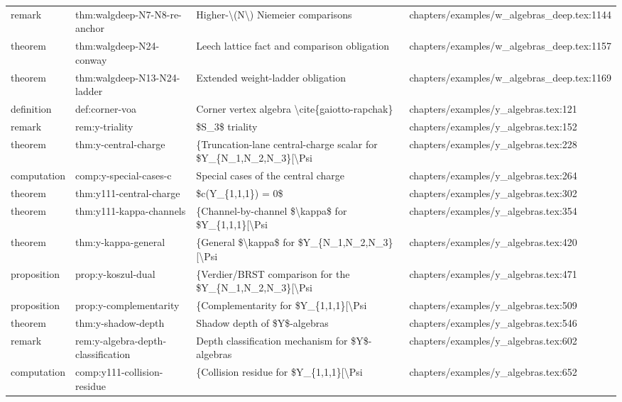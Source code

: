 \documentclass[11pt]{article}
\begin{document}
\begin{longtable}{L{0.10\textwidth}L{0.26\textwidth}L{0.42\textwidth}L{0.22\textwidth}}
remark & thm:walgdeep-N7-N8-re-anchor & Higher-\textbackslash{}(N\textbackslash{}) Niemeier comparisons & chapters/examples/w\_algebras\_deep.tex:1144\\
theorem & thm:walgdeep-N24-conway & Leech lattice fact and comparison obligation & chapters/examples/w\_algebras\_deep.tex:1157\\
theorem & thm:walgdeep-N13-N24-ladder & Extended weight-ladder obligation & chapters/examples/w\_algebras\_deep.tex:1169\\
definition & def:corner-voa & Corner vertex algebra \textbackslash{}cite\{gaiotto-rapchak\} & chapters/examples/y\_algebras.tex:121\\
remark & rem:y-triality & \$S\_3\$ triality & chapters/examples/y\_algebras.tex:152\\
theorem & thm:y-central-charge & \{Truncation-lane central-charge scalar for \$Y\_\{N\_1,N\_2,N\_3\}[\textbackslash{}Psi & chapters/examples/y\_algebras.tex:228\\
computation & comp:y-special-cases-c & Special cases of the central charge & chapters/examples/y\_algebras.tex:264\\
theorem & thm:y111-central-charge & \$c(Y\_\{1,1,1\}) = 0\$ & chapters/examples/y\_algebras.tex:302\\
theorem & thm:y111-kappa-channels & \{Channel-by-channel \$\textbackslash{}kappa\$ for \$Y\_\{1,1,1\}[\textbackslash{}Psi & chapters/examples/y\_algebras.tex:354\\
theorem & thm:y-kappa-general & \{General \$\textbackslash{}kappa\$ for \$Y\_\{N\_1,N\_2,N\_3\}[\textbackslash{}Psi & chapters/examples/y\_algebras.tex:420\\
proposition & prop:y-koszul-dual & \{Verdier/BRST comparison for the \$Y\_\{N\_1,N\_2,N\_3\}[\textbackslash{}Psi & chapters/examples/y\_algebras.tex:471\\
proposition & prop:y-complementarity & \{Complementarity for \$Y\_\{1,1,1\}[\textbackslash{}Psi & chapters/examples/y\_algebras.tex:509\\
theorem & thm:y-shadow-depth & Shadow depth of \$Y\$-algebras & chapters/examples/y\_algebras.tex:546\\
remark & rem:y-algebra-depth-classification & Depth classification mechanism for \$Y\$-algebras & chapters/examples/y\_algebras.tex:602\\
computation & comp:y111-collision-residue & \{Collision residue for \$Y\_\{1,1,1\}[\textbackslash{}Psi & chapters/examples/y\_algebras.tex:652\\

\end{longtable}
\end{document}
